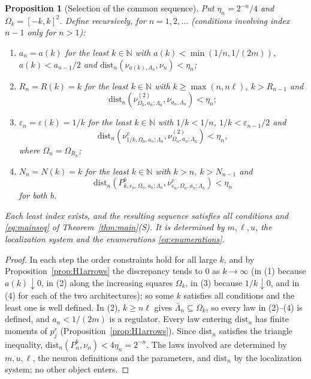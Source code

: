 \documentclass[11pt]{article}
\theoremstyle{plain}
\newtheorem{proposition}[theorem]{Proposition}
\theoremstyle{definition}
\theoremstyle{remark}
\newcommand{\N}{\mathbb{N}}
\newcommand{\dist}{\mathrm{dist}}
\begin{document}
\begin{proposition}[Selection of the common sequence]\label{prop:H1seq}
Put $\eta_n=2^{-n}/4$ and $\Omega_k=[-k,k]^{2}$. Define recursively, for $n=1,2,\dots$
(conditions involving index $n-1$ only for $n>1$):
\begin{enumerate}[label=(\arabic*)]
\item $a_n=a(k)$ for the least $k\in\N$ with $a(k)<\min(1/n,1/(2m))$, $a(k)<a_{n-1}/2$ and
  $\dist_n(\nu_{a(k),\Lambda_n},\nu_n)<\eta_n$;
\item $R_n=R(k)=k$ for the least $k\in\N$ with $k\ge\max(n,n\ell)$, $k>R_{n-1}$ and
  \[
  \dist_n(\nu^{(2)}_{\Omega_k,a_n;\Lambda_n},\nu_{a_n,\Lambda_n})<\eta_n;
  \]
\item $\varepsilon_n=\varepsilon(k)=1/k$ for the least $k\in\N$ with $1/k<1/n$, $1/k<\varepsilon_{n-1}/2$ and
  \[
  \dist_n(\nu^{v}_{1/k,\Omega_n,a_n;\Lambda_n},\nu^{(2)}_{\Omega_n,a_n;\Lambda_n})<\eta_n,
  \]
  where $\Omega_n=\Omega_{R_n}$;
\item $N_n=N(k)=k$ for the least $k\in\N$ with $k>n$, $k>N_{n-1}$ and
  \[
  \dist_n(P^{b}_{k,\varepsilon_n,\Omega_n,a_n;\Lambda_n},\nu^{v}_{\varepsilon_n,\Omega_n,a_n;\Lambda_n})<\eta_n
  \]
  for both $b$.
\end{enumerate}
Each least index exists, and the resulting sequence satisfies all conditions
and \eqref{eq:mainseq} of Theorem~\ref{thm:main}(S). It is determined by $m,\ell,u$,
the localization system and the enumerations \eqref{eq:enumerations}.
\end{proposition}

\begin{proof}
In each step the order constraints hold for all large $k$, and by
Proposition~\ref{prop:H1arrows} the discrepancy tends to $0$ as $k\to\infty$ (in (1)
because $a(k)\downarrow0$, in (2) along the increasing squares $\Omega_k$, in (3) because
$1/k\downarrow0$, and in (4) for each of the two architectures); so some $k$ satisfies
all conditions and the least one is well defined. In (2), $k\ge n\ell$ gives
$\bar\Lambda_n\subseteq\Omega_k$, so every law in (2)--(4) is defined, and $a_n<1/(2m)$ is a
regulator. Every law entering $\dist_n$ has finite moments of $p_j^{r}$
(Proposition~\ref{prop:H1arrows}). Since $\dist_n$ satisfies the triangle inequality,
$\dist_n(P^{b}_{n},\nu_n)<4\eta_n=2^{-n}$. The laws involved are determined by
$m,u,\ell$, the neuron definitions and the parameters, and $\dist_n$ by the
localization system; no other object enters.
\end{proof}
\end{document}
